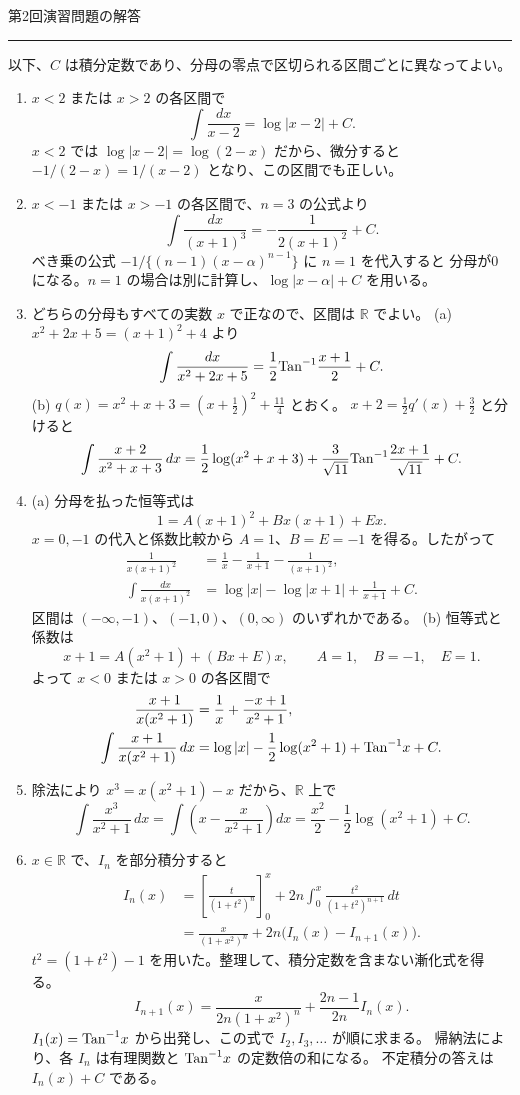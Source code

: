 \documentclass[a4paper,10pt,pdflatex,ja=standard,jafont=ipaex-type1,
  magstyle=real,scale=1]{bxjsarticle}
\newcommand{\handouttitle}[1]{%
  \begin{center}
    {\Large\color{ink}#1}\par\vspace{3mm}
    {\color{accent}\rule{0.88\linewidth}{0.7pt}}
  \end{center}\vspace{-2mm}}
\newenvironment{problems}
  {\begin{enumerate}[leftmargin=2em,itemsep=3pt,topsep=3pt,parsep=0pt,
    font=\color{accent}]}
  {\end{enumerate}}
\begin{document}
\newpage
\handouttitle{第2回\quad 演習問題の解答}
{\small 以下、$C$ は積分定数であり、分母の零点で区切られる区間ごとに異なってよい。}\par
\begin{problems}
\setlength{\itemsep}{5pt}
\item $x<2$ または $x>2$ の各区間で
$$
 \int\frac{dx}{x-2}=\log|x-2|+C.
$$
$x<2$ では $\log|x-2|=\log(2-x)$ だから、微分すると
$-1/(2-x)=1/(x-2)$ となり、この区間でも正しい。

\item $x<-1$ または $x>-1$ の各区間で、$n=3$ の公式より
$$
 \int\frac{dx}{(x+1)^3}=-\frac1{2(x+1)^2}+C.
$$
べき乗の公式 $-1/\{(n-1)(x-\alpha)^{n-1}\}$ に $n=1$ を代入すると
分母が0になる。$n=1$ の場合は別に計算し、$\log|x-\alpha|+C$ を用いる。

\item どちらの分母もすべての実数 $x$ で正なので、区間は $\mathbb R$ でよい。
(a) $x^2+2x+5=(x+1)^2+4$ より
$$
 \int\frac{dx}{x^2+2x+5}=\frac12{\rm Tan}^{-1} \frac{x+1}{2}+C.
$$
(b) $q(x)=x^2+x+3=(x+\tfrac12)^2+\tfrac{11}{4}$ とおく。
$x+2=\tfrac12q'(x)+\tfrac32$ と分けると
$$
 \int\frac{x+2}{x^2+x+3}\,dx
 =\frac12\log(x^2+x+3)+\frac3{\sqrt{11}}{\rm Tan}^{-1} \frac{2x+1}{\sqrt{11}}+C.
$$

\item (a) 分母を払った恒等式は
$$
 1=A(x+1)^2+Bx(x+1)+Ex.
$$
$x=0,-1$ の代入と係数比較から $A=1$、$B=E=-1$ を得る。したがって
$$
 \begin{aligned}
 \frac1{x(x+1)^2}&=\frac1x-\frac1{x+1}-\frac1{(x+1)^2},\\
 \int\frac{dx}{x(x+1)^2}&=\log|x|-\log|x+1|+\frac1{x+1}+C.
 \end{aligned}
$$
区間は $(-\infty,-1)$、$(-1,0)$、$(0,\infty)$ のいずれかである。
(b) 恒等式と係数は
$$
 x+1=A(x^2+1)+(Bx+E)x,\qquad A=1,\quad B=-1,\quad E=1.
$$
よって $x<0$ または $x>0$ の各区間で
$$
 \begin{aligned}
 \frac{x+1}{x(x^2+1)}&=\frac1x+\frac{-x+1}{x^2+1},\\
 \int\frac{x+1}{x(x^2+1)}\,dx
 &=\log|x|-\frac12\log(x^2+1)+{\rm Tan}^{-1}  x+C.
 \end{aligned}
$$

\item 除法により $x^3=x(x^2+1)-x$ だから、$\mathbb R$ 上で
$$
 \int\frac{x^3}{x^2+1}\,dx
 =\int\left(x-\frac{x}{x^2+1}\right)dx
 =\frac{x^2}{2}-\frac12\log(x^2+1)+C.
$$

\item $x\in\mathbb R$ で、$I_n$ を部分積分すると
$$
 \begin{aligned}
 I_n(x)&=\left[\frac{t}{(1+t^2)^n}\right]_0^x
       +2n\int_0^x\frac{t^2}{(1+t^2)^{n+1}}\,dt\\
 &=\frac{x}{(1+x^2)^n}+2n\bigl(I_n(x)-I_{n+1}(x)\bigr).
 \end{aligned}
$$
$t^2=(1+t^2)-1$ を用いた。整理して、積分定数を含まない漸化式を得る。
$$
 I_{n+1}(x)=\frac{x}{2n(1+x^2)^n}+\frac{2n-1}{2n}I_n(x).
$$
$I_1(x)={\rm Tan}^{-1}  x$ から出発し、この式で $I_2,I_3,\ldots$ が順に求まる。
帰納法により、各 $I_n$ は有理関数と ${\rm Tan}^{-1}  x$ の定数倍の和になる。
不定積分の答えは $I_n(x)+C$ である。
\end{problems}
\end{document}

